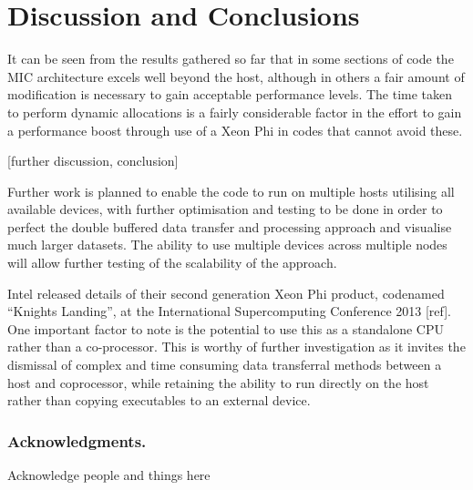 \documentclass[runningheads,a4paper]{llncs}
\begin{document}
\section{Discussion and Conclusions}
\label{sect:conclusions}

It can be seen from the results gathered so far that in some sections of code the MIC architecture excels well beyond the host, 
although in others a fair amount of modification is necessary to gain acceptable performance levels. The time taken to perform 
dynamic allocations is a fairly considerable factor in the effort to gain a performance boost through use of a Xeon Phi in codes 
that cannot avoid these. 

[further discussion, conclusion]

Further work is planned to enable the code to run on multiple hosts utilising all available devices, with further optimisation and 
testing to be done in order to perfect the double buffered data transfer and processing approach and visualise much larger datasets.
The ability to use multiple devices across multiple nodes will allow further testing of the scalability of the approach.

Intel released details of their second generation Xeon Phi product, codenamed “Knights Landing”,  at the International Supercomputing 
Conference 2013 [ref]. One important factor to note is the potential to use this as a standalone CPU rather than a co-processor. 
This is worthy of further investigation as it invites the dismissal of complex and time consuming data transferral methods between 
a host and coprocessor, while retaining the ability to run directly on the host rather than copying executables to an external device.
 

\subsubsection{Acknowledgments.}

Acknowledge people and things here

\end{document}
